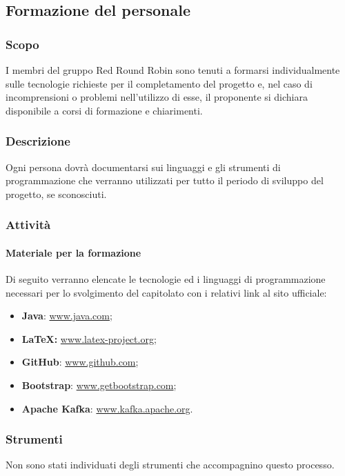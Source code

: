 \subsection{Formazione del personale}

	\subsubsection{Scopo}
		I membri del gruppo Red Round Robin sono tenuti a formarsi individualmente sulle tecnologie richieste per il completamento del progetto e, nel caso di incomprensioni o problemi nell'utilizzo di esse, il proponente si dichiara disponibile a corsi di formazione e chiarimenti.
		
	\subsubsection{Descrizione}
		Ogni persona dovrà documentarsi sui linguaggi e gli strumenti di programmazione che verranno utilizzati per tutto il periodo di sviluppo del progetto, se sconosciuti.
		
	\subsubsection{Attività}

		\paragraph{Materiale per la formazione}
		Di seguito verranno elencate le tecnologie ed i linguaggi di programmazione necessari per lo svolgimento del capitolato con i relativi link al sito ufficiale:
		\begin{itemize}
			\item \textbf{Java}: \href{https://www.java.com/}{www.java.com};
			\item \textbf{\LaTeX{}:} \href{www.latex-project.org}{www.latex-project.org};
			\item \textbf{GitHub}: \href{www.github.com}{www.github.com};
			\item \textbf{Bootstrap}: \href{https://getbootstrap.com/}{www.getbootstrap.com};
			\item \textbf{Apache Kafka}: \href{https://kafka.apache.org/}{www.kafka.apache.org}.
		\end{itemize}

	\subsubsection{Strumenti}
		Non sono stati individuati degli strumenti che accompagnino questo processo.
